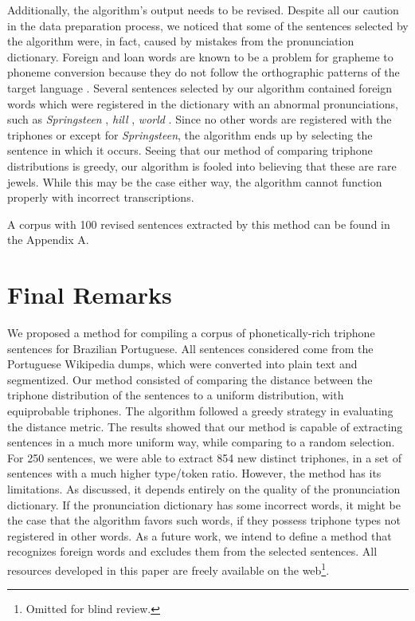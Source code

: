 Additionally, the algorithm's output needs to be revised. Despite all our caution in the data preparation process, we noticed
that some of the sentences selected by the algorithm were, in fact, caused by mistakes from the pronunciation dictionary.
Foreign and loan words are known to be a problem for grapheme to 
phoneme conversion because they do not follow the orthographic patterns of the target language \cite{Steigner2007}. Several 
sentences selected by our algorithm contained foreign words which were registered in the dictionary with an abnormal pronunciations, such
as \emph{Springsteen} , \emph{hill} \textipa{[iww]}, \emph{world} \textipa{[wohwdZ]}. Since no other words are registered with the triphones \textipa{[e-e+\~e]} or \textipa{[e-\~e]} except for 
\emph{Springsteen}, the algorithm ends up by selecting the sentence in which it occurs. Seeing that our method 
of comparing triphone distributions is greedy, our algorithm is fooled into believing that these are rare jewels. 
While this may be the case either way, the algorithm cannot function properly with incorrect transcriptions. 

A corpus with 100 revised sentences extracted by this method can be found in the Appendix A.

\clearpage
\section{Final Remarks}

We proposed a method for compiling a corpus of phonetically-rich triphone sentences for Brazilian Portuguese.
All sentences considered come from the Portuguese Wikipedia dumps, which were converted into plain
text and segmentized. Our method consisted of comparing the distance between the triphone distribution
of the sentences to a uniform distribution, with equiprobable triphones. The algorithm followed
a greedy strategy in evaluating the distance metric. The results showed that our method is capable 
of extracting sentences in a much more uniform way, while comparing to a random selection. 
For 250 sentences, we were able to extract 854 new distinct triphones, in a set of sentences
with a much higher type/token ratio. However, the method has its limitations. As discussed,
it depends entirely on the quality of the pronunciation dictionary. If the pronunciation dictionary
has some incorrect words, it might be the case that the algorithm favors such words, if they possess
triphone types not registered in other words. As a future work, we intend to define a method that recognizes foreign words and excludes them from the selected sentences. All resources developed in this paper are freely available on the web\footnote{Omitted for blind review.}.

